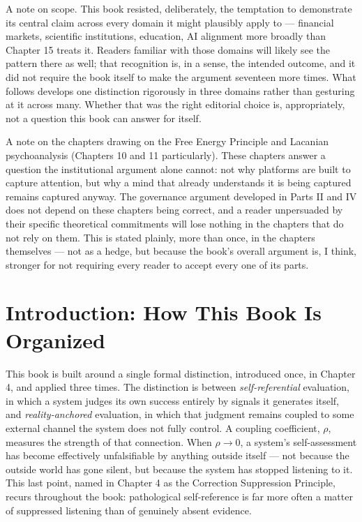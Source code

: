\documentclass[12pt,a4paper]{book}
\begin{document}
A note on scope. This book resisted, deliberately, the temptation to demonstrate its central claim across every domain it might plausibly apply to — financial markets, scientific institutions, education, AI alignment more broadly than Chapter 15 treats it. Readers familiar with those domains will likely see the pattern there as well; that recognition is, in a sense, the intended outcome, and it did not require the book itself to make the argument seventeen more times. What follows develops one distinction rigorously in three domains rather than gesturing at it across many. Whether that was the right editorial choice is, appropriately, not a question this book can answer for itself.

A note on the chapters drawing on the Free Energy Principle and Lacanian psychoanalysis (Chapters 10 and 11 particularly). These chapters answer a question the institutional argument alone cannot: not why platforms are built to capture attention, but why a mind that already understands it is being captured remains captured anyway. The governance argument developed in Parts II and IV does not depend on these chapters being correct, and a reader unpersuaded by their specific theoretical commitments will lose nothing in the chapters that do not rely on them. This is stated plainly, more than once, in the chapters themselves — not as a hedge, but because the book's overall argument is, I think, stronger for not requiring every reader to accept every one of its parts.

\newpage


\chapter*{Introduction: How This Book Is Organized}

This book is built around a single formal distinction, introduced once, in Chapter 4, and applied three times. The distinction is between \emph{self-referential} evaluation, in which a system judges its own success entirely by signals it generates itself, and \emph{reality-anchored} evaluation, in which that judgment remains coupled to some external channel the system does not fully control. A coupling coefficient, $\rho$, measures the strength of that connection. When $\rho \to 0$, a system's self-assessment has become effectively unfalsifiable by anything outside itself — not because the outside world has gone silent, but because the system has stopped listening to it. This last point, named in Chapter 4 as the Correction Suppression Principle, recurs throughout the book: pathological self-reference is far more often a matter of suppressed listening than of genuinely absent evidence.
\end{document}
